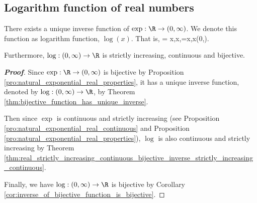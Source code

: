 \subsection{Logarithm function of real numbers}




\begin{theorem}\label{thm:logarithm_function_real_numbers}
There exists a unique inverse function of $\exp:\R\to (0,\infty)$. We denote this function as logarithm function, $\log(x)$. That is,
\be
\log{} = x,\quad \forall x\in \R,\qquad \exp{}=x,\quad \forall x\in (0,\infty).
\ee

Furthermore, $\log:(0,\infty)\to \R$ is strictly increasing, continuous and bijective.
\end{theorem}


\begin{proof}[\bf Proof]%
Since $\exp:\R\to (0,\infty)$ is bijective by Proposition \ref{pro:natural_exponential_real_properties}, it has a unique inverse function, denoted by $\log:(0,\infty)\to \R$, by Theorem \ref{thm:bijective_function_has_unique_inverse}.

Then since $\exp$ is continuous and strictly increasing (see Proposition \ref{pro:natural_exponential_real_continuous} and Proposition \ref{pro:natural_exponential_real_properties}), $\log$ is also continuous and strictly increasing by Theorem \ref{thm:real_strictly_increasing_continuous_bijective_inverse_strictly_increasing_continuous}.

Finally, we have $\log:(0,\infty)\to \R$ is bijective by Corollary \ref{cor:inverse_of_bijective_function_is_bijective}.
\end{proof}


